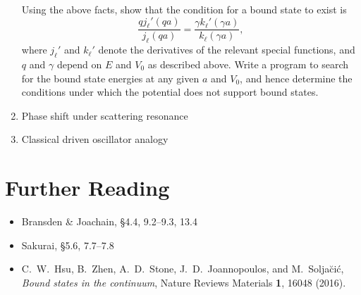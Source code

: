 \documentclass[pra,12pt]{revtex4}
\begin{document}
\begin{enumerate}
  Using the above facts, show that the condition for a bound state to
  exist is
  $$\frac{qj_\ell'(qa)}{j_\ell(qa)} = \frac{\gamma k_\ell'(\gamma a)}{k_\ell(\gamma a)},$$
  where $j_\ell'$ and $k_\ell'$ denote the derivatives of the relevant
  special functions, and $q$ and $\gamma$ depend on $E$ and $V_0$ as
  described above.  Write a program to search for the bound state
  energies at any given $a$ and $V_0$, and hence determine the
  conditions under which the potential does not support bound
  states.



\label{ex:boundstate3d}

\item Phase shift under scattering resonance

\item Classical driven oscillator analogy  
\end{enumerate}




\section*{Further Reading}

\begin{itemize}
\item Bransden \& Joachain, \S4.4, 9.2--9.3, 13.4
\item Sakurai, \S5.6, 7.7--7.8

\item 
  C.~W.~Hsu, B.~Zhen, A.~D.~Stone, J.~D.~Joannopoulos, and
  M.~Solja\u{c}i\'{c}, \textit{Bound states in the continuum},
  Nature Reviews Materials \textbf{1}, 16048 (2016).
  \label{cite:hsu}
\end{itemize}
\end{document}
